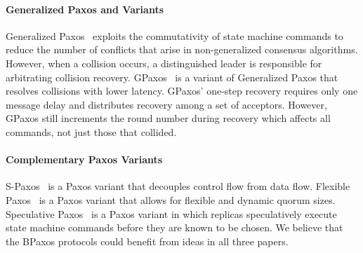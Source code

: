 \paragraph{Generalized Paxos and Variants}
Generalized Paxos~\cite{lamport2005generalized} exploits the commutativity of
state machine commands to reduce the number of conflicts that arise in
non-generalized consensus algorithms. However, when a collision occurs, a
distinguished leader is responsible for arbitrating collision recovery.
%
GPaxos~\cite{sutra2011fast} is a variant of Generalized Paxos that resolves
collisions with lower latency. GPaxos' one-step recovery requires only one
message delay and distributes recovery among a set of acceptors. However,
GPaxos still increments the round number during recovery which affects all
commands, not just those that collided.

\paragraph{Complementary Paxos Variants}
S-Paxos~\cite{biely2012s} is a Paxos variant that decouples control flow from
data flow. Flexible Paxos~\cite{howard2016flexible} is a Paxos variant that
allows for flexible and dynamic quorum sizes. Speculative
Paxos~\cite{ports2015designing} is a Paxos variant in which replicas
speculatively execute state machine commands before they are known to be
chosen. We believe that the BPaxos protocols could benefit from ideas in all
three papers.
